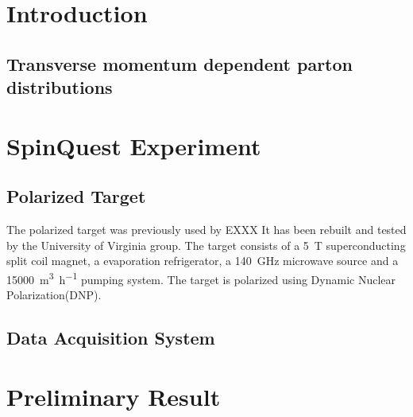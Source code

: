 \section{Introduction}

\subsection{Transverse momentum dependent parton distributions}

\section{SpinQuest Experiment}

\subsection{Polarized Target}
The polarized target was previously used by EXXX It has been rebuilt and tested by the University of 
Virginia group. The target consists of a \SI{5}{\tesla} superconducting 
split coil magnet, a   evaporation refrigerator, a \SI{140}{\GHz} 
microwave source and a \SI{15000}{\cubic\meter\per\hour} pumping system. The 
target is polarized using Dynamic Nuclear Polarization(DNP)\cite{crabb1995}.

\subsection{Data Acquisition System}

\section{Preliminary Result}
